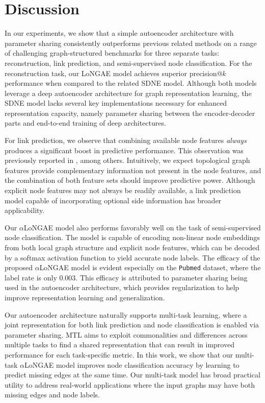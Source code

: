\documentclass[letterpaper, conference]{IEEEtran}
\begin{document}
\section{Discussion}
In our experiments, we show that a simple autoencoder architecture with parameter sharing consistently outperforms previous related methods on a range of challenging graph-structured benchmarks for three separate tasks: reconstruction, link prediction, and semi-supervised node classification. For the reconstruction task, our LoNGAE model achieves superior precision@$k$ performance when compared to the related SDNE model. Although both models leverage a deep autoencoder architecture for graph representation learning, the SDNE model lacks several key implementations necessary for enhanced representation capacity, namely parameter sharing between the encoder-decoder parts and end-to-end training of deep architectures.

For link prediction, we observe that combining available node features \emph{always} produces a significant boost in predictive performance. This observation was previously reported in \cite{Menon:2011,VGAE:2016}, among others. Intuitively, we expect topological graph features provide complementary information not present in the node features, and the combination of both feature sets should improve predictive power. Although explicit node features may not always be readily available, a link prediction model capable of incorporating optional side information has broader applicability.

Our $\alpha$LoNGAE model also performs favorably well on the task of semi-supervised node classification. The model is capable of encoding non-linear node embeddings from both local graph structure and explicit node features, which can be decoded by a softmax activation function to yield accurate node labels. The efficacy of the proposed $\alpha$LoNGAE model is evident especially on the \texttt{Pubmed} dataset, where the label rate is only 0.003. This efficacy is attributed to parameter sharing being used in the autoencoder architecture, which provides regularization to help improve representation learning and generalization.

Our autoencoder architecture naturally supports multi-task learning, where a joint representation for both link prediction and node classification is enabled via parameter sharing. MTL aims to exploit commonalities and differences across multiple tasks to find a shared representation that can result in improved performance for each task-specific metric. In this work, we show that our multi-task $\alpha$LoNGAE model improves node classification accuracy by learning to predict missing edges at the same time. Our multi-task model has broad practical utility to address real-world applications where the input graphs may have both missing edges and node labels.
\end{document}
